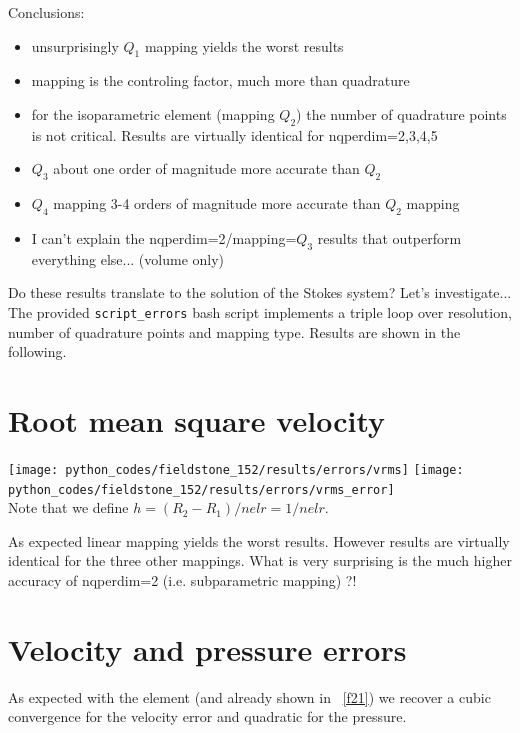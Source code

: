 \noindent Conclusions:
\begin{itemize}
\item unsurprisingly $Q_1$ mapping yields the worst results
\item mapping is the controling factor, much more than quadrature
\item for the isoparametric element (mapping $Q_2$) the number of quadrature points 
is not critical. Results are virtually identical for nqperdim=2,3,4,5
\item $Q_3$ about one order of magnitude more accurate than $Q_2$ 
\item $Q_4$ mapping 3-4 orders of magnitude more accurate than $Q_2$ mapping
\item I can't explain the nqperdim=2/mapping=$Q_3$ results that outperform everything else... (volume only)
\end{itemize}

Do these results translate to the solution of the Stokes system? Let's investigate...
The provided {\tt script\_errors} bash script implements a triple loop 
over resolution, number of quadrature points and mapping type.
Results are shown in the following.

\newpage
\section*{Root mean square velocity}

\begin{center}
\texttt{[image: python\_codes/fieldstone\_152/results/errors/vrms]}
\texttt{[image: python\_codes/fieldstone\_152/results/errors/vrms\_error]}\\
Note that we define $h=(R_2-R_1)/nelr=1/nelr$. 
\end{center}

As expected linear mapping yields the worst results. However results are virtually identical for 
the three other mappings.
What is very surprising is the much higher accuracy of nqperdim=2 (i.e. subparametric mapping) ?!


\section*{Velocity and pressure errors}


As expected with the \QtwoQone element (and already shown in \stone~\ref{f21})
we recover a cubic convergence for the velocity error and quadratic for the 
pressure. 

